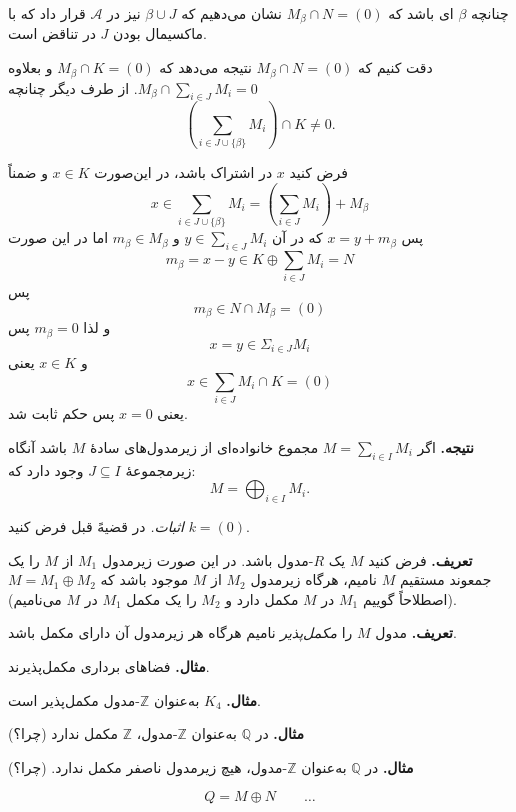 چنانچه
\(\beta\)
ای باشد که
$M_\beta \cap N =(0)$
نشان می‌دهیم که
\(\beta \cup J\)
نیز در
\(\mathcal{A}\)
قرار داد که با ماکسیمال بودن
\(J\)
در تناقض است.


دقت کنیم که
$M_\beta \cap N =(0)$
نتیجه می‌دهد که
$M_\beta \cap K =(0)$
و بعلاوه
$M_\beta \cap \sum_{i \in J} M_i = 0$.
از طرف دیگر چنانچه
\[
    \left(\sum_{i \in J \cup \{\beta\}} M_i\right) \cap K \neq 0.
\]

فرض کنید $x$ در اشتراک باشد،
در این‌صورت
$x\in K$
و ضمناً
\[
    x \in \sum_{i \in J \cup \{\beta\}} M_i = \left(\sum_{i \in J} M_i\right)  + M_\beta
\]
پس
$x = y + m_\beta$
که در آن
\(y \in \sum_{i \in J} M_i\)
و
\(m_\beta \in M_\beta\)
اما در این صورت
\[
    m_\beta = x - y \in K \oplus \sum_{i \in J} M_i = N
\]
پس
\[
    m_\beta \in  N \cap M_\beta  = (0)
\]
و لذا
\(m_\beta = 0 \)
پس
\[
    x=y \in \Sigma_{i\in J} M_i
\]
و
\(x \in K\)
یعنی
\[
    x \in  \sum_{i \in J} M_i \cap K  = (0)
\]
یعنی
\(x = 0\)
پس حکم ثابت شد.


\hrulefill

\textbf{نتیجه.}
اگر $M = \sum_{i \in I} M_i$ مجموع خانواده‌ای از زیرمدول‌های سادهٔ $M$ باشد آنگاه
زیرمجموعهٔ
$J \subseteq I$ وجود دارد که:
\[
    M = \bigoplus_{i \in I} M_i.
\]



\textit{اثبات.}
در قضیهً قبل
فرض کنید
\( k = (0) \).

\textbf{تعریف.} فرض کنید \( M \) یک \( R \)-مدول باشد.
در این صورت زیرمدول
\( M_1 \)
از
\( M \)
را یک جمعوند مستقیم
\( M \)
نامیم، هرگاه زیرمدول
\( M_2 \)
از
\( M \)
موجود باشد که
\( M = M_1 \oplus M_2 \)
(اصطلاحاً گوییم \( M_1 \) در \( M \) مکمل دارد و \( M_2 \) را یک مکمل \( M_1 \) در \( M \) می‌نامیم).



\textbf{تعریف.} مدول \( M \) را \textit{مکمل‌پذیر} نامیم هرگاه هر زیرمدول آن دارای مکمل باشد.

\textbf{مثال.} فضاهای برداری مکمل‌پذیرند.

\textbf{مثال.}
\(K_4\)
به‌عنوان
\( \mathbb{Z} \)-مدول مکمل‌پذیر است.

\textbf{مثال.} در \( \mathbb{Q} \) به‌عنوان \( \mathbb{Z} \)-مدول، \( \mathbb{Z} \) مکمل ندارد (چرا؟)

\textbf{مثال.} در \( \mathbb{Q} \) به‌عنوان \( \mathbb{Z} \)-مدول، هیچ زیرمدول ناصفر مکمل ندارد. (چرا؟)

\[
    Q = M \oplus N
    \qquad \ldots
\]

